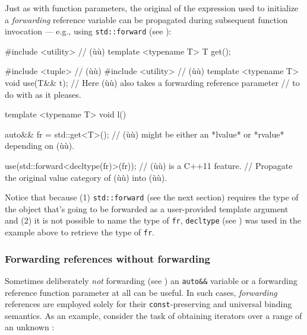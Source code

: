\noindent Just as with function parameters, the original 
of the expression used to initialize a \emph{forwarding} reference
variable can be propagated during subsequent function invocation ---
e.g., using \lstinline!std::forward! (see ):

\begin{emcppshiddenlisting}[emcppsbatch=e5]
#include <utility>  // (ù{}ù)
template <typename T>
T get();
\end{emcppshiddenlisting}
\begin{emcppslisting}[emcppsbatch=e5]
#include <tuple>   // (ù{}ù)
#include <utility> // (ù{}ù)
template <typename T>
void use(T&& t); // Here (ù{}ù) also takes a forwarding reference parameter
                 // to do with as it pleases.

template <typename T>
void l()
{
    auto&& fr = std::get<T>();
        // (ù{}ù) might be either an *lvalue* or *rvalue* depending on (ù{}ù).

    use(std::forward<decltype(fr)>(fr));  // (ù{}ù) is a C++11 feature.
        // Propagate the original value category of (ù{}ù) into (ù{}ù).
}
\end{emcppslisting}

\noindent Notice that because (1) \lstinline!std::forward! (see the next section) requires the
type of the object that's going to be forwarded as a user-provided
template argument and (2) it is not possible to name the type of
\lstinline!fr!, \lstinline!decltype! (see )
was used in the example above
to retrieve the type of \lstinline!fr!.

\subsubsection[Forwarding references without forwarding]{Forwarding references without forwarding}\label{forwarding-references-without-forwarding}

Sometimes deliberately \emph{not} forwarding (see )
an \lstinline!auto&&! variable or
a forwarding reference function parameter at all can be useful. In such cases, \emph{forwarding} references are employed solely for their \lstinline!const!-preserving
and universal binding semantics. As an example, consider the task of
obtaining iterators over a range of an unknown :

